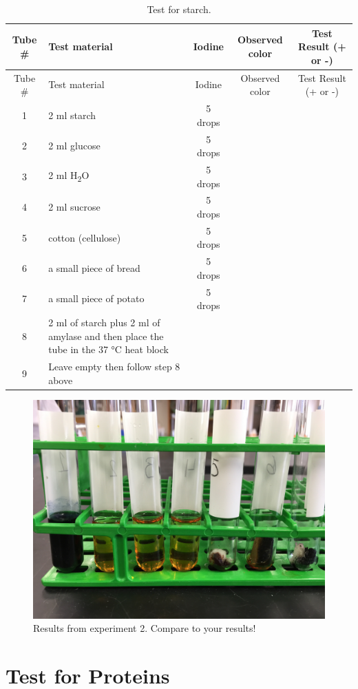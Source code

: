 \begin{longtable}[]{@{}clccc@{}}
\caption{\label{tab:starch} Test for starch.}\tabularnewline
\toprule
Tube \# & Test material & Iodine & Observed color & Test Result (+ or
-)\tabularnewline
\midrule
\endfirsthead
\toprule
Tube \# & Test material & Iodine & Observed color & Test Result (+ or
-)\tabularnewline
\midrule
\endhead
1 & 2 ml starch & 5 drops & &\tabularnewline
2 & 2 ml glucose & 5 drops & &\tabularnewline
3 & 2 ml H\textsubscript{2}O & 5 drops & &\tabularnewline
4 & 2 ml sucrose & 5 drops & &\tabularnewline
5 & cotton (cellulose) & 5 drops & &\tabularnewline
6 & a small piece of bread & 5 drops & &\tabularnewline
7 & a small piece of potato & 5 drops & &\tabularnewline
8 & 2 ml of starch plus 2 ml of amylase and then place the tube in the 37 °C heat block & & &\tabularnewline
9 & Leave empty then follow step 8 above & &
&\tabularnewline
\bottomrule
\end{longtable}

\begin{figure}

{\centering \includegraphics[width=0.7\linewidth]{./figures/chem_aspects/Results_exp_2} 

}

\caption{Results from experiment 2. Compare to your results!}\label{fig:exp2}
\end{figure}

\section{Test for Proteins}\label{test-for-proteins}

